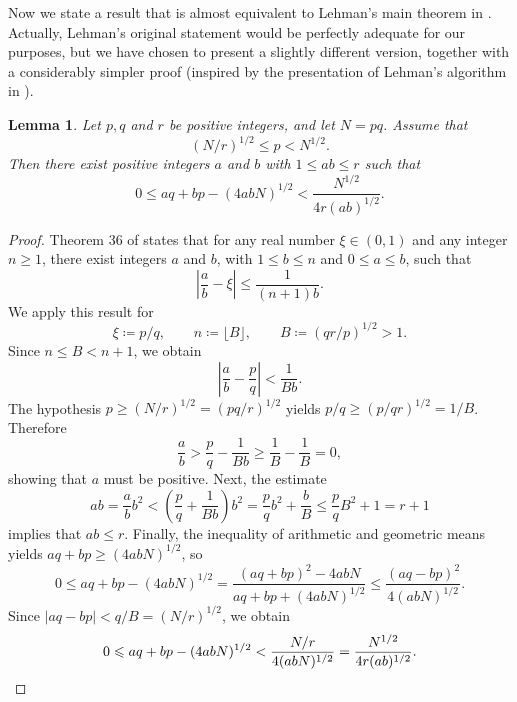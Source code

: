 \documentclass[reqno]{amsart}
\newtheorem{lem}[thm]{Lemma}
\theoremstyle{remark}
\numberwithin{equation}{section}
\numberwithin{thm}{section}
\renewcommand{\leq}{\leqslant}
\renewcommand{\geq}{\geqslant}
\newcommand{\defeq}{\coloneqq}
\begin{document}
Now we state a result that is almost equivalent to Lehman's main theorem
in \cite{Leh-factoring}.
Actually, Lehman's original statement would be perfectly adequate for our
purposes,
but we have chosen to present a slightly different version,
together with a considerably simpler proof
(inspired by the presentation of Lehman's algorithm
in \cite[Thm.~5.1.3]{CP-primes}).
\begin{lem}
\label{lem:lehman}
  Let $p, q$ and $r$ be positive integers, and let $N = pq$.
  Assume that
  \begin{equation}
  \label{eq:p-condition}
    (N/r)^{1/2} \leq p < N^{1/2}.
  \end{equation}
  Then there exist positive integers $a$ and $b$ with $1 \leq ab \leq r$ such that
  \begin{equation}
  \label{eq:lehman-inequality}
    0 \leq aq + bp - (4abN)^{1/2} < \frac{N^{1/2}}{4 r (ab)^{1/2}}.
  \end{equation}
\end{lem}
\begin{proof}
  Theorem 36 of \cite{HW-intro-NT} states that for any real number
  $\xi \in (0,1)$ and any integer $n \geq 1$,
  there exist integers $a$ and $b$,
  with $1 \leq b \leq n$ and $0 \leq a \leq b$, such that
    \[ \left| \frac{a}{b} - \xi \right| \leq \frac{1}{(n+1)b}. \]
  We apply this result for
    \[ \xi \defeq p/q, \qquad n \defeq \lfloor B \rfloor, \qquad B \defeq (qr/p)^{1/2} > 1. \]
  Since $n \leq B < n+1$, we obtain
    \[ \left| \frac{a}{b} - \frac{p}{q} \right| < \frac{1}{Bb}. \]
  The hypothesis $p \geq (N/r)^{1/2} = (pq/r)^{1/2}$ yields
  $p/q \geq (p/qr)^{1/2} = 1/B$. Therefore
    \[ \frac{a}{b} > \frac{p}{q} - \frac{1}{Bb} \geq \frac{1}{B} - \frac{1}{B} = 0, \]
  showing that $a$ must be positive.
  Next, the estimate
    \[ ab = \frac{a}{b} b^2 < \left(\frac{p}{q} + \frac{1}{Bb}\right) b^2
          = \frac{p}{q} b^2 + \frac{b}{B} \leq \frac{p}{q} B^2 + 1 = r + 1 \]
  implies that $ab \leq r$.
  Finally, the inequality of arithmetic and geometric means yields
  $aq + bp \geq (4abN)^{1/2}$, so
    \[ 0 \leq aq + bp - (4abN)^{1/2} = \frac{(aq + bp)^2 - 4abN}{aq + bp + (4abN)^{1/2}}
      \leq \frac{(aq - bp)^2}{4(abN)^{1/2}}. \]
  Since $|aq - bp| < q/B = (N/r)^{1/2}$, we obtain
    \[ 0 \leq aq + bp - (4abN)^{1/2} < \frac{N/r}{4(abN)^{1/2}} = \frac{N^{1/2}}{4r(ab)^{1/2}}. \qedhere \]
\end{proof}
\end{document}
